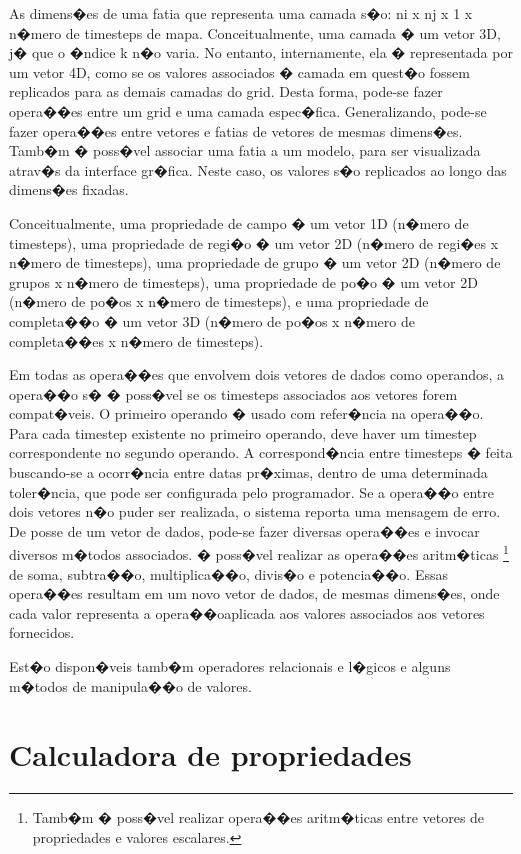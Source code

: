 \documentclass[dissertacao,modelo1,brazil]{ThesisPUC}
\begin{document}
As dimens�es de uma fatia que representa uma camada s�o: ni x nj x 1 x n�mero 
de timesteps de mapa. Conceitualmente, uma camada � um vetor 3D, j� que o 
�ndice k n�o varia. No entanto, internamente, ela � representada por um vetor 
4D, como se os valores associados � camada em quest�o fossem replicados para 
as demais camadas do grid. Desta forma, pode-se fazer opera��es entre um grid 
e uma camada espec�fica. Generalizando, pode-se fazer opera��es entre vetores 
e fatias de vetores de mesmas dimens�es. Tamb�m � poss�vel associar uma fatia 
a um modelo, para ser visualizada atrav�s da interface gr�fica. Neste caso, os 
valores s�o replicados ao longo das dimens�es fixadas.

Conceitualmente, uma propriedade de campo � um vetor 1D (n�mero de 
timesteps), uma propriedade de regi�o � um vetor 2D (n�mero de regi�es x 
n�mero de timesteps), uma propriedade de grupo � um vetor 2D (n�mero de 
grupos x n�mero de timesteps), uma propriedade de po�o � um vetor 2D 
(n�mero de po�os x n�mero de timesteps), e uma propriedade de completa��o � 
um vetor 3D (n�mero de po�os x n�mero de completa��es x n�mero de 
timesteps).

Em todas as opera��es que envolvem dois vetores de dados como operandos, a 
opera��o s� � poss�vel se os timesteps associados aos vetores forem compat�veis. 
O primeiro operando � usado com refer�ncia na opera��o. Para cada timestep 
existente no primeiro operando, deve haver um timestep correspondente no 
segundo operando. A correspond�ncia entre timesteps � feita buscando-se a 
ocorr�ncia entre datas pr�ximas, dentro de uma determinada toler�ncia, que pode
ser configurada pelo programador. Se a opera��o entre dois vetores n�o puder ser
realizada, o sistema reporta uma mensagem de erro. 
De posse de um vetor de dados, pode-se fazer diversas 
opera��es e invocar diversos m�todos associados.
� poss�vel realizar as opera��es aritm�ticas 
\footnote{Tamb�m � poss�vel realizar opera��es aritm�ticas entre vetores
de propriedades e valores escalares.}
de soma, subtra��o, multiplica��o, divis�o e potencia��o.
Essas opera��es resultam em um novo vetor de dados, de mesmas
dimens�es, onde cada valor representa a opera��oaplicada aos
valores associados aos vetores fornecidos.\cite{Tecg06}

Est�o dispon�veis tamb�m operadores relacionais e l�gicos 
e alguns m�todos de manipula��o de valores.


\chapter{Calculadora de propriedades}
\end{document}
